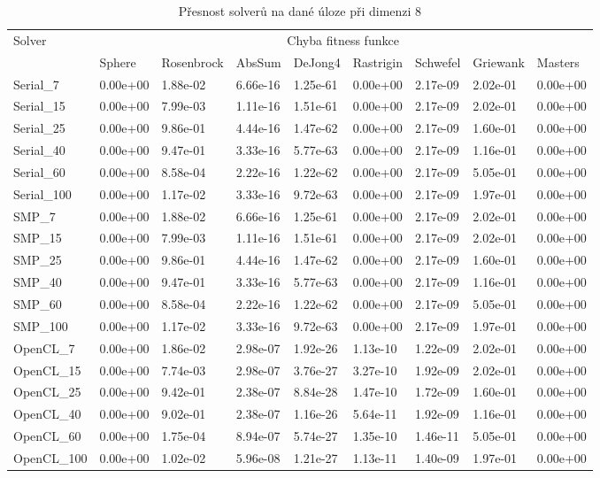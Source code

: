 \documentclass[12pt, a4paper]{report}
\begin{document}
\begin{table}
	\scriptsize
	\caption{Přesnost solverů na dané úloze při dimenzi 8}
	\centering
	\label{tbl:results8}
	\begin{tabular}{l|l|l|l|l|l|l|l|l}
		\multirow{2}{*}{Solver} & \multicolumn{8}{c}{Chyba fitness funkce} \\
		& Sphere & Rosenbrock & AbsSum & DeJong4 & Rastrigin & Schwefel & Griewank & Masters \\
		\hline
		\hline
		Serial\_7 & 0.00e+00 & 1.88e-02 & 6.66e-16 & 1.25e-61 & 0.00e+00 & 2.17e-09 & 2.02e-01 & 0.00e+00 \\
		Serial\_15 & 0.00e+00 & 7.99e-03 & 1.11e-16 & 1.51e-61 & 0.00e+00 & 2.17e-09 & 2.02e-01 & 0.00e+00 \\
		Serial\_25 & 0.00e+00 & 9.86e-01 & 4.44e-16 & 1.47e-62 & 0.00e+00 & 2.17e-09 & 1.60e-01 & 0.00e+00 \\
		Serial\_40 & 0.00e+00 & 9.47e-01 & 3.33e-16 & 5.77e-63 & 0.00e+00 & 2.17e-09 & 1.16e-01 & 0.00e+00 \\
		Serial\_60 & 0.00e+00 & 8.58e-04 & 2.22e-16 & 1.22e-62 & 0.00e+00 & 2.17e-09 & 5.05e-01 & 0.00e+00 \\
		Serial\_100 & 0.00e+00 & 1.17e-02 & 3.33e-16 & 9.72e-63 & 0.00e+00 & 2.17e-09 & 1.97e-01 & 0.00e+00 \\
		\hline
		SMP\_7 & 0.00e+00 & 1.88e-02 & 6.66e-16 & 1.25e-61 & 0.00e+00 & 2.17e-09 & 2.02e-01 & 0.00e+00 \\
		SMP\_15 & 0.00e+00 & 7.99e-03 & 1.11e-16 & 1.51e-61 & 0.00e+00 & 2.17e-09 & 2.02e-01 & 0.00e+00 \\
		SMP\_25 & 0.00e+00 & 9.86e-01 & 4.44e-16 & 1.47e-62 & 0.00e+00 & 2.17e-09 & 1.60e-01 & 0.00e+00 \\
		SMP\_40 & 0.00e+00 & 9.47e-01 & 3.33e-16 & 5.77e-63 & 0.00e+00 & 2.17e-09 & 1.16e-01 & 0.00e+00 \\
		SMP\_60 & 0.00e+00 & 8.58e-04 & 2.22e-16 & 1.22e-62 & 0.00e+00 & 2.17e-09 & 5.05e-01 & 0.00e+00 \\
		SMP\_100 & 0.00e+00 & 1.17e-02 & 3.33e-16 & 9.72e-63 & 0.00e+00 & 2.17e-09 & 1.97e-01 & 0.00e+00 \\
		\hline
		OpenCL\_7 & 0.00e+00 & 1.86e-02 & 2.98e-07 & 1.92e-26 & 1.13e-10 & 1.22e-09 & 2.02e-01 & 0.00e+00 \\
		OpenCL\_15 & 0.00e+00 & 7.74e-03 & 2.98e-07 & 3.76e-27 & 3.27e-10 & 1.92e-09 & 2.02e-01 & 0.00e+00 \\
		OpenCL\_25 & 0.00e+00 & 9.42e-01 & 2.38e-07 & 8.84e-28 & 1.47e-10 & 1.72e-09 & 1.60e-01 & 0.00e+00 \\
		OpenCL\_40 & 0.00e+00 & 9.02e-01 & 2.38e-07 & 1.16e-26 & 5.64e-11 & 1.92e-09 & 1.16e-01 & 0.00e+00 \\
		OpenCL\_60 & 0.00e+00 & 1.75e-04 & 8.94e-07 & 5.74e-27 & 1.35e-10 & 1.46e-11 & 5.05e-01 & 0.00e+00 \\
		OpenCL\_100 & 0.00e+00 & 1.02e-02 & 5.96e-08 & 1.21e-27 & 1.13e-11 & 1.40e-09 & 1.97e-01 & 0.00e+00 \\
	\end{tabular}
\end{table}
\end{document}
